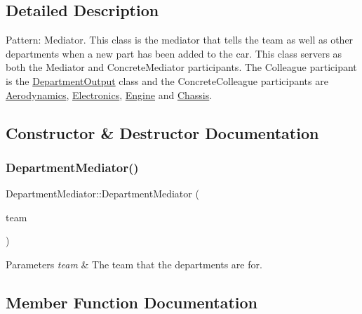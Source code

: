 \subsection{Detailed Description}
Pattern\+: Mediator. This class is the mediator that tells the team as well as other departments when a new part has been added to the car. This class servers as both the Mediator and Concrete\+Mediator participants. The Colleague participant is the \hyperlink{classDepartmentOutput}{Department\+Output} class and the Concrete\+Colleague participants are \hyperlink{classAerodynamics}{Aerodynamics}, \hyperlink{classElectronics}{Electronics}, \hyperlink{classEngine}{Engine} and \hyperlink{classChassis}{Chassis}. 

\subsection{Constructor \& Destructor Documentation}
\mbox{\label{classDepartmentMediator_ae237a0b0e0ca262e2e51254be2b894d3}} 
\subsubsection{\texorpdfstring{Department\+Mediator()}{DepartmentMediator()}}
{\footnotesize\ttfamily Department\+Mediator\+::\+Department\+Mediator (\begin{DoxyParamCaption}\item[{\hyperlink{classTeam}{Team} $\ast$}]{team }\end{DoxyParamCaption})}


\begin{DoxyParams}{Parameters}
{\em team} & The team that the departments are for. \\
\hline
\end{DoxyParams}


\subsection{Member Function Documentation}
\mbox{\label{classDepartmentMediator_a24fa0b87c5dbcbf2868e062d599b49e3}} 
